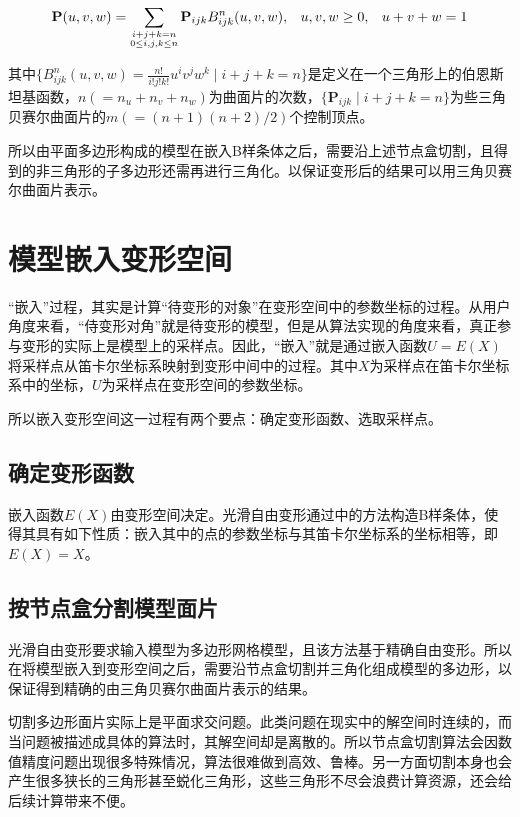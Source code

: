\begin{equation}
	\footnotesize
	{\mathbf P}(u,v,w)
	= \sum_{\substack{i+j+k=n \\ 0\leq i,j,k\leq n}} {\mathbf P}_{ijk}B^n_{ijk}(u,v,w), \hspace{8 pt} u,v,w\ge0,
		\hspace{8 pt}u+v+w=1
	\label{equ:Puvw}
\end{equation}

其中$\{B_{ijk}^n(u,v,w)=\frac{n!}{i!j!k!}u^iv^jw^k \mid i+j+k=n\}$是定义在一个三角形上的伯恩斯坦基函数，$n(=n_u+n_v+n_w)$为曲面片的次数，$\{\mathbf P_{ijk} \mid i+j+k=n\}$为些三角贝赛尔曲面片的$m(=(n+1)(n+2)/2)$个控制顶点。

所以由平面多边形构成的模型在嵌入B样条体之后，需要沿上述节点盒切割，且得到的非三角形的子多边形还需再进行三角化。以保证变形后的结果可以用三角贝赛尔曲面片表示。

\section{模型嵌入变形空间}
“嵌入”过程，其实是计算“待变形的对象”在变形空间中的参数坐标的过程。从用户角度来看，“侍变形对角”就是待变形的模型，但是从算法实现的角度来看，真正参与变形的实际上是模型上的采样点。因此，“嵌入”就是通过嵌入函数$U=E(X)$将采样点从笛卡尔坐标系映射到变形中间中的过程。其中$X$为采样点在笛卡尔坐标系中的坐标，$U$为采样点在变形空间的参数坐标。

所以嵌入变形空间这一过程有两个要点：确定变形函数、选取采样点。

\subsection{确定变形函数}

嵌入函数$E(X)$由变形空间决定。光滑自由变形通过\cite{Feng02}中的方法构造B样条体，使得其具有如下性质：嵌入其中的点的参数坐标与其笛卡尔坐标系的坐标相等，即$E(X)=X$。

\subsection{按节点盒分割模型面片}
光滑自由变形要求输入模型为多边形网格模型，且该方法基于精确自由变形\cite{Feng98}。所以在将模型嵌入到变形空间之后，需要沿节点盒切割并三角化组成模型的多边形，以保证得到精确的由三角贝赛尔曲面片表示的结果。

切割多边形面片实际上是平面求交问题。此类问题在现实中的解空间时连续的，而当问题被描述成具体的算法时，其解空间却是离散的。所以节点盒切割算法会因数值精度问题出现很多特殊情况，算法很难做到高效、鲁棒。另一方面切割本身也会产生很多狭长的三角形甚至蜕化三角形，这些三角形不尽会浪费计算资源，还会给后续计算带来不便。

